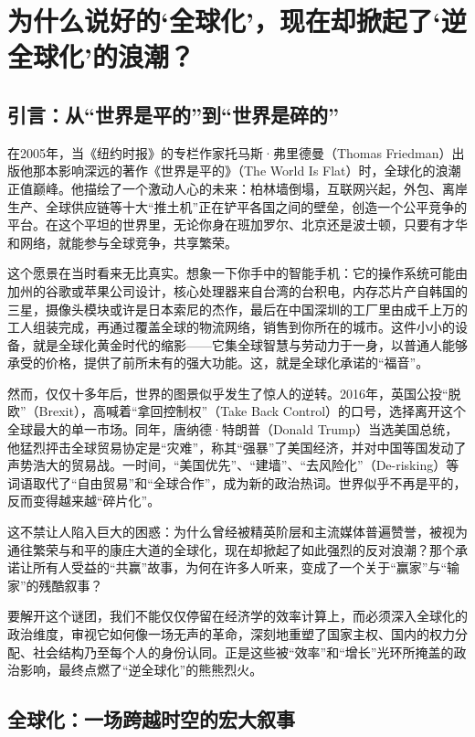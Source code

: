 \chapter{为什么说好的‘全球化’，现在却掀起了‘逆全球化’的浪潮？}

\section{引言：从“世界是平的”到“世界是碎的”}

在2005年，当《纽约时报》的专栏作家托马斯·弗里德曼（Thomas Friedman）出版他那本影响深远的著作《世界是平的》（The World Is Flat）时，全球化的浪潮正值巅峰。他描绘了一个激动人心的未来：柏林墙倒塌，互联网兴起，外包、离岸生产、全球供应链等十大“推土机”正在铲平各国之间的壁垒，创造一个公平竞争的平台。在这个平坦的世界里，无论你身在班加罗尔、北京还是波士顿，只要有才华和网络，就能参与全球竞争，共享繁荣。

这个愿景在当时看来无比真实。想象一下你手中的智能手机：它的操作系统可能由加州的谷歌或苹果公司设计，核心处理器来自台湾的台积电，内存芯片产自韩国的三星，摄像头模块或许是日本索尼的杰作，最后在中国深圳的工厂里由成千上万的工人组装完成，再通过覆盖全球的物流网络，销售到你所在的城市。这件小小的设备，就是全球化黄金时代的缩影——它集全球智慧与劳动力于一身，以普通人能够承受的价格，提供了前所未有的强大功能。这，就是全球化承诺的“福音”。

然而，仅仅十多年后，世界的图景似乎发生了惊人的逆转。2016年，英国公投“脱欧”（Brexit），高喊着“拿回控制权”（Take Back Control）的口号，选择离开这个全球最大的单一市场。同年，唐纳德·特朗普（Donald Trump）当选美国总统，他猛烈抨击全球贸易协定是“灾难”，称其“强暴”了美国经济，并对中国等国发动了声势浩大的贸易战。一时间，“美国优先”、“建墙”、“去风险化”（De-risking）等词语取代了“自由贸易”和“全球合作”，成为新的政治热词。世界似乎不再是平的，反而变得越来越“碎片化”。

这不禁让人陷入巨大的困惑：为什么曾经被精英阶层和主流媒体普遍赞誉，被视为通往繁荣与和平的康庄大道的全球化，现在却掀起了如此强烈的反对浪潮？那个承诺让所有人受益的“共赢”故事，为何在许多人听来，变成了一个关于“赢家”与“输家”的残酷叙事？

要解开这个谜团，我们不能仅仅停留在经济学的效率计算上，而必须深入全球化的政治维度，审视它如何像一场无声的革命，深刻地重塑了国家主权、国内的权力分配、社会结构乃至每个人的身份认同。正是这些被“效率”和“增长”光环所掩盖的政治影响，最终点燃了“逆全球化”的熊熊烈火。

\section{全球化：一场跨越时空的宏大叙事}

